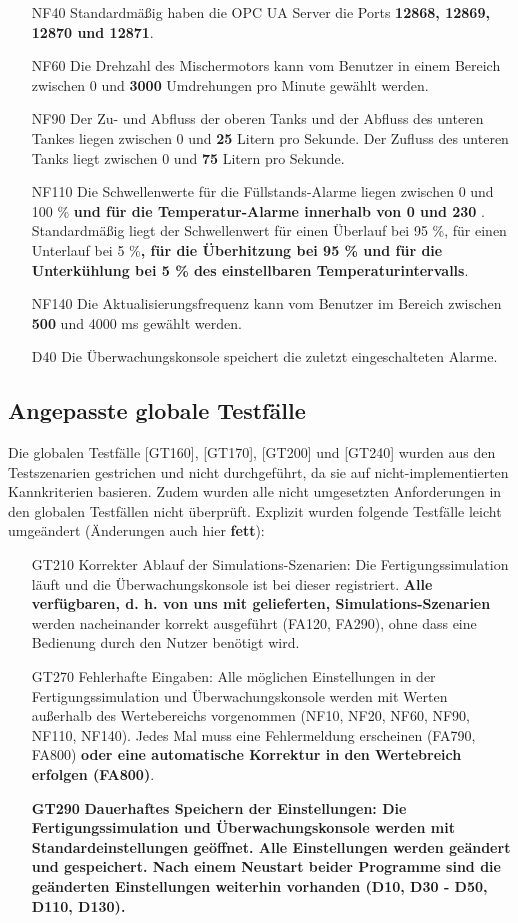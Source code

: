 \documentclass[parskip=full]{scrartcl}
\begin{document}
\begin{enumerate}
	\item[NF40] Standardmäßig haben die OPC UA Server die Ports \textbf{12868, 12869, 12870 und 12871}.
	\item[NF60] Die Drehzahl des Mischermotors kann vom Benutzer in einem Bereich zwischen 0 und \textbf{3000} Umdrehungen pro Minute gewählt werden.
	\item[NF90] Der Zu- und Abfluss der oberen Tanks und der Abfluss des unteren Tankes liegen zwischen 0 und \textbf{25} Litern pro Sekunde. Der Zufluss des unteren Tanks liegt zwischen 0 und \textbf{75} Litern pro Sekunde.
	\item[NF110] Die Schwellenwerte für die Füllstands-Alarme liegen zwischen 0 und 100 \% \textbf{und für die Temperatur-Alarme innerhalb von 0 \textcelsius und 230 \textcelsius}. Standardmäßig liegt der Schwellenwert für einen Überlauf bei 95 \%, für einen Unterlauf bei 5 \%\textbf{, für die Überhitzung bei 95 \% und für die Unterkühlung bei 5 \% des einstellbaren Temperaturintervalls}.
	\item[NF140] Die Aktualisierungsfrequenz kann vom Benutzer im Bereich zwischen \textbf{500} und 4000 ms gewählt werden.
	\item[D40] Die Überwachungskonsole speichert die zuletzt eingeschalteten Alarme.
\end{enumerate}

\subsection{Angepasste globale Testfälle}
Die globalen Testfälle [GT160], [GT170], [GT200] und [GT240] wurden aus den Testszenarien gestrichen und nicht durchgeführt, da sie auf nicht-implementierten Kannkriterien basieren.
Zudem wurden alle nicht umgesetzten Anforderungen in den globalen Testfällen nicht überprüft. Explizit wurden folgende Testfälle leicht umgeändert (Änderungen auch hier \textbf{fett}):

\begin{enumerate}
	\item[GT210] Korrekter Ablauf der Simulations-Szenarien: Die Fertigungssimulation läuft und die Überwachungskonsole ist bei dieser registriert. \textbf{Alle verfügbaren, d. h. von uns mit gelieferten, Simulations-Szenarien} werden nacheinander korrekt ausgeführt (FA120, FA290), ohne dass eine Bedienung durch den Nutzer benötigt wird.
	\item[GT270] Fehlerhafte Eingaben: Alle möglichen Einstellungen in der Fertigungssimulation und Überwachungskonsole werden mit Werten außerhalb des Wertebereichs vorgenommen (NF10, NF20, NF60, NF90, NF110, NF140). Jedes Mal muss eine Fehlermeldung erscheinen (FA790, FA800) \textbf{oder eine automatische Korrektur in den Wertebreich erfolgen (FA800)}.
	\item[\textbf{GT290}] \textbf{Dauerhaftes Speichern der Einstellungen: Die Fertigungssimulation und Überwachungskonsole werden mit Standardeinstellungen geöffnet. Alle Einstellungen werden geändert und gespeichert. Nach einem Neustart beider Programme sind die geänderten Einstellungen weiterhin vorhanden (D10, D30 - D50, D110, D130).}
\end{enumerate}
\end{document}
